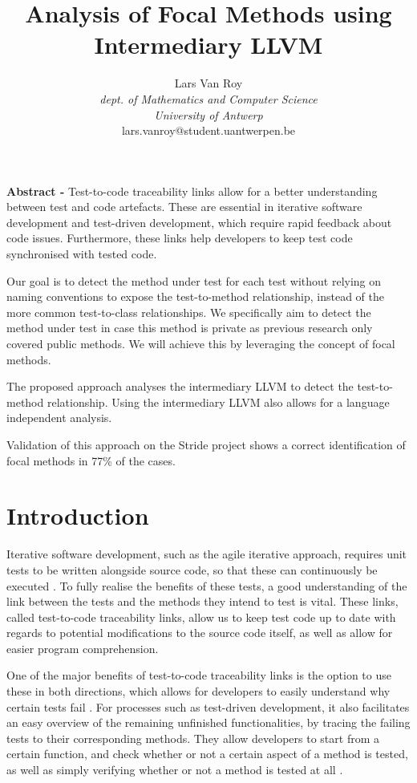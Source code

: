 \documentclass[11pt]{article}
\title{\vspace{-3cm}Analysis of Focal Methods using Intermediary LLVM}
\author{Lars Van Roy\\
\textit{dept. of Mathematics and Computer Science} \\
\textit{University of Antwerp}\\
lars.vanroy@student.uantwerpen.be}
\begin{document}
\maketitle{}

\begin{multicols}{2}

\noindent
\textbf{Abstract - } Test-to-code traceability links allow for a better understanding between test and code artefacts. These are essential in iterative software development and test-driven development, which require rapid feedback about code issues. Furthermore, these links help developers to keep test code synchronised with tested code.

Our goal is to detect the method under test for each test without relying on naming conventions to expose the test-to-method relationship, instead of the more common test-to-class relationships. We specifically aim to detect the method under test in case this method is private as previous research only covered public methods. We will achieve this by leveraging the concept of focal methods.

The proposed approach analyses the intermediary LLVM to detect the test-to-method relationship. Using the intermediary LLVM also allows for a language independent analysis.

Validation of this approach on the Stride project shows a correct identification of focal methods in 77\% of the cases.

\section{Introduction}
Iterative software development, such as the agile iterative approach, requires unit tests to be written alongside source code, so that these can continuously be executed \cite{6298092}. To fully realise the benefits of these tests, a good understanding of the link between the tests and the methods they intend to test is vital. These links, called test-to-code traceability links, allow us to keep test code up to date with regards to potential modifications to the source code itself, as well as allow for easier program comprehension.

One of the major benefits of test-to-code traceability links is the option to use these in both directions, which allows for developers to easily understand why certain tests fail \cite{6716450}. For processes such as test-driven development, it also facilitates an easy overview of the remaining unfinished functionalities, by tracing the failing tests to their corresponding methods. They allow developers to start from a certain function, and check whether or not a certain aspect of a method is tested, as well as simply verifying whether or not a method is tested at all \cite{hayes2009towards}.


\end{multicols}
\end{document}
